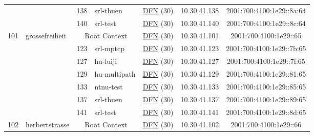 \begin{small}
\begin{center}
\begin{longtable}{|c|c|c|c|c|c|c|c|}
  &  & \tiny{138} & \multicolumn{1}{|l|}{\tiny{srl-thuen}} & \multicolumn{2}{|c|}{\tiny{\href{https://www.dfn.de}{DFN} (30)}} & \tiny{10.30.41.138} & \tiny{2001:700:4100:1e29::8a:64} \\* \cline{3-3}\cline{4-4}\cline{5-5}\cline{6-6}\cline{7-7}\cline{8-8}
  &  & \tiny{140} & \multicolumn{1}{|l|}{\tiny{srl-test}} & \multicolumn{2}{|c|}{\tiny{\href{https://www.dfn.de}{DFN} (30)}} & \tiny{10.30.41.140} & \tiny{2001:700:4100:1e29::8c:64} \\ \hline
 \multirow{7}{*}{\tiny{101}} & \multicolumn{1}{|l|}{\multirow{7}{*}{\tiny{grossefreiheit}}} & \multicolumn{2}{|c|}{\tiny{Root Context}} & \multicolumn{2}{|c|}{\tiny{\href{https://www.dfn.de}{DFN} (30)}} & \tiny{10.30.41.101} & \tiny{2001:700:4100:1e29::65} \\* \cline{3-3}\cline{4-4}\cline{5-5}\cline{6-6}\cline{7-7}\cline{8-8}
  &  & \tiny{123} & \multicolumn{1}{|l|}{\tiny{srl-mptcp}} & \multicolumn{2}{|c|}{\tiny{\href{https://www.dfn.de}{DFN} (30)}} & \tiny{10.30.41.123} & \tiny{2001:700:4100:1e29::7b:65} \\* \cline{3-3}\cline{4-4}\cline{5-5}\cline{6-6}\cline{7-7}\cline{8-8}
  &  & \tiny{127} & \multicolumn{1}{|l|}{\tiny{hu-luiji}} & \multicolumn{2}{|c|}{\tiny{\href{https://www.dfn.de}{DFN} (30)}} & \tiny{10.30.41.127} & \tiny{2001:700:4100:1e29::7f:65} \\* \cline{3-3}\cline{4-4}\cline{5-5}\cline{6-6}\cline{7-7}\cline{8-8}
  &  & \tiny{129} & \multicolumn{1}{|l|}{\tiny{hu-multipath}} & \multicolumn{2}{|c|}{\tiny{\href{https://www.dfn.de}{DFN} (30)}} & \tiny{10.30.41.129} & \tiny{2001:700:4100:1e29::81:65} \\* \cline{3-3}\cline{4-4}\cline{5-5}\cline{6-6}\cline{7-7}\cline{8-8}
  &  & \tiny{133} & \multicolumn{1}{|l|}{\tiny{ntnu-test}} & \multicolumn{2}{|c|}{\tiny{\href{https://www.dfn.de}{DFN} (30)}} & \tiny{10.30.41.133} & \tiny{2001:700:4100:1e29::85:65} \\* \cline{3-3}\cline{4-4}\cline{5-5}\cline{6-6}\cline{7-7}\cline{8-8}
  &  & \tiny{137} & \multicolumn{1}{|l|}{\tiny{srl-thuen}} & \multicolumn{2}{|c|}{\tiny{\href{https://www.dfn.de}{DFN} (30)}} & \tiny{10.30.41.137} & \tiny{2001:700:4100:1e29::89:65} \\* \cline{3-3}\cline{4-4}\cline{5-5}\cline{6-6}\cline{7-7}\cline{8-8}
  &  & \tiny{141} & \multicolumn{1}{|l|}{\tiny{srl-test}} & \multicolumn{2}{|c|}{\tiny{\href{https://www.dfn.de}{DFN} (30)}} & \tiny{10.30.41.141} & \tiny{2001:700:4100:1e29::8d:65} \\ \hline
 \multirow{7}{*}{\tiny{102}} & \multicolumn{1}{|l|}{\multirow{7}{*}{\tiny{herbertstrasse}}} & \multicolumn{2}{|c|}{\tiny{Root Context}} & \multicolumn{2}{|c|}{\tiny{\href{https://www.dfn.de}{DFN} (30)}} & \tiny{10.30.41.102} & \tiny{2001:700:4100:1e29::66} \\* \cline{3-3}\cline{4-4}\cline{5-5}\cline{6-6}\cline{7-7}\cline{8-8}

\end{longtable}
\end{center}
\end{small}
